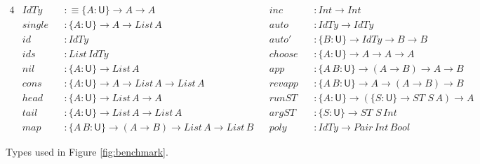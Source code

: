 \documentclass[acmsmall,review,anonymous,prologue,dvipsnames]{acmart}\settopmatter{printfolios=true,printccs=false,printacmref=false}
\renewcommand{\U}{\mathsf{U}}
\newcommand{\mi}[1]{\mathit{#1}}
\theoremstyle{remark}
\begin{document}
{\small

\begin{figure}
\begin{alignat*}{4}
  & \mi{IdTy}   && :\equiv \{A : \U\}\to A \to A   \hspace{10em}         && \mi{inc}    && : \mi{Int} \to \mi{Int}                                        \\
  & \mi{single} && : \{A : \U\} \to A \to \mi{List}\,A                        && \mi{auto}   && : IdTy \to IdTy                                      \\
  & \mi{id}     && : IdTy                                                && \mi{auto'}  && : \{B : \U\}\to IdTy \to B \to B                     \\
  & \mi{ids}    && : \mi{List}\,IdTy                                          && \mi{choose} && : \{A : \U\} \to A \to A \to A                       \\
  & \mi{nil}    && : \{A : \U\}\to \mi{List}\,A                               && \mi{app}    && : \{A\,B : \U\} \to (A \to B) \to A \to B            \\
  & \mi{cons}   && : \{A : \U\} \to A \to \mi{List}\,A \to \mi{List}\,A            && \mi{revapp} && : \{A\,B : \U\} \to A \to (A \to B) \to B            \\
  & \mi{head}   && : \{A : \U\} \to \mi{List}\,A \to A                        && \mi{runST}  && : \{A : \U\} \to (\{S : \U\} \to \mi{ST}\,\,S\,A) \to A     \\
  & \mi{tail}   && : \{A : \U\} \to \mi{List}\,A \to \mi{List}\,A                  && \mi{argST}  && : \{S : \U\}\to \mi{ST}\,\,S\,\mi{Int}                           \\
  & \mi{map}    && : \{A\,B : \U\} \to (A \to B) \to \mi{List}\,A \to \mi{List}\,B && \mi{poly}   && : IdTy \to \mi{Pair}\,\mi{Int}\,\mi{Bool}
\end{alignat*}
\caption{Types used in Figure \ref{fig:benchmark}.}
\label{fig:benchmark_types}
\end{figure}

}
\end{document}
